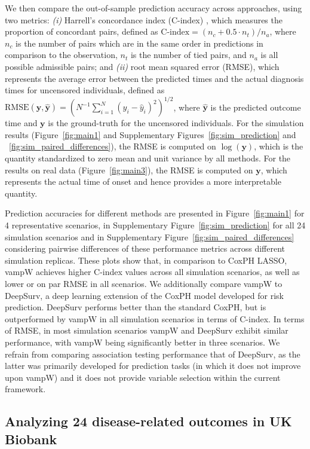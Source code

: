 We then compare the out-of-sample prediction accuracy across approaches, using two metrics: \emph{(i)} Harrell's concordance index (C-index) \cite{harrell_evaluating_1982}, which measures the proportion of concordant pairs, defined as $\text{C-index}=(n_{c} + 0.5 \cdot n_t) / n_{a}$, where $n_{c}$ is the number of pairs which are in the same order in predictions in comparison to the observation, $n_{t}$ is the number of tied pairs, and $n_{a}$ is all possible admissible pairs; and \emph{(ii)} root mean squared error (RMSE), which represents the average error between the predicted times and the actual diagnosis times for uncensored individuals, defined as $\text{RMSE}(\bm{y}, \hat{\bm{y}})= (N^{-1} \sum_{i=1}^{N} (y_i - \hat{y}_i)^2)^{1/2}$, where $\hat{\bm{y}}$ is the predicted outcome time and $\bm{y}$ is the ground-truth for the uncensored individuals. For the simulation results (Figure~\ref{fig:main1} and Supplementary Figures~\ref{fig:sim_prediction} and ~\ref{fig:sim_paired_differences}), the RMSE is computed on $\log(\bm{y})$, which is the quantity standardized to zero mean and unit variance by all methods. For the results on real data (Figure~\ref{fig:main3}), the RMSE is computed on $\bm{y}$, which represents the actual time of onset and hence provides a more interpretable quantity.

Prediction accuracies for different methods are presented in Figure~\ref{fig:main1} for 4 representative scenarios, in Supplementary Figure~\ref{fig:sim_prediction} for all 24 simulation scenarios and in Supplementary Figure~\ref{fig:sim_paired_differences} considering pairwise differences of these performance metrics across different simulation replicas. These plots show that, in comparison to CoxPH LASSO, vampW achieves higher C-index values across all simulation scenarios, as well as lower or on par RMSE in all scenarios. We additionally compare vampW to DeepSurv, a deep learning extension of the CoxPH model developed for risk prediction. DeepSurv performs better than the standard CoxPH, but is outperformed by vampW in all simulation scenarios in terms of C-index. In terms of RMSE, in most simulation scenarios vampW and DeepSurv exhibit similar performance, with vampW being significantly better in three scenarios. We refrain from comparing association testing performance that of DeepSurv, as the latter was primarily developed for prediction tasks (in which it does not improve upon vampW) and it does not provide variable selection within the current framework. 

\subsection{Analyzing 24 disease-related outcomes in UK Biobank}

